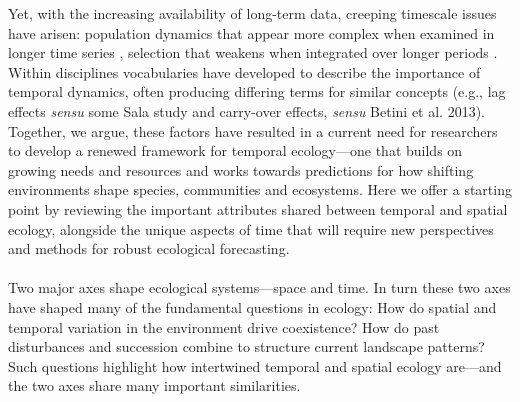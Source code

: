\documentclass[11pt,a4paper,oneside]{article}
\begin{document}
Yet, with the increasing availability of long-term data, creeping timescale issues have arisen: population dynamics that appear more complex when examined in longer time series \citep{Ziebarth2010}, selection that weakens when integrated over longer periods \citep{schoener2011,Uyeda2011}. Within disciplines vocabularies have developed to describe the importance of temporal dynamics, often producing differing terms for similar concepts (e.g., lag effects \emph{sensu} some Sala study and carry-over effects, \emph{sensu} Betini et al. 2013). Together, we argue, these factors have resulted in a current need for researchers to develop a renewed framework for temporal ecology---one that builds on growing needs and resources and works towards predictions for how shifting environments shape species, communities and ecosystems. Here we offer a starting point by reviewing the important attributes shared between temporal and spatial ecology, alongside the unique aspects of time that will require new perspectives and methods for robust ecological forecasting. \\

\\

Two major axes shape ecological systems---space and time. In turn these two axes have shaped many of the fundamental questions in ecology: How do spatial and temporal variation in the environment drive coexistence? How do past disturbances and succession combine to structure current landscape patterns? Such questions highlight how intertwined temporal and spatial ecology are---and the two axes share many important similarities.\\
\end{document}
